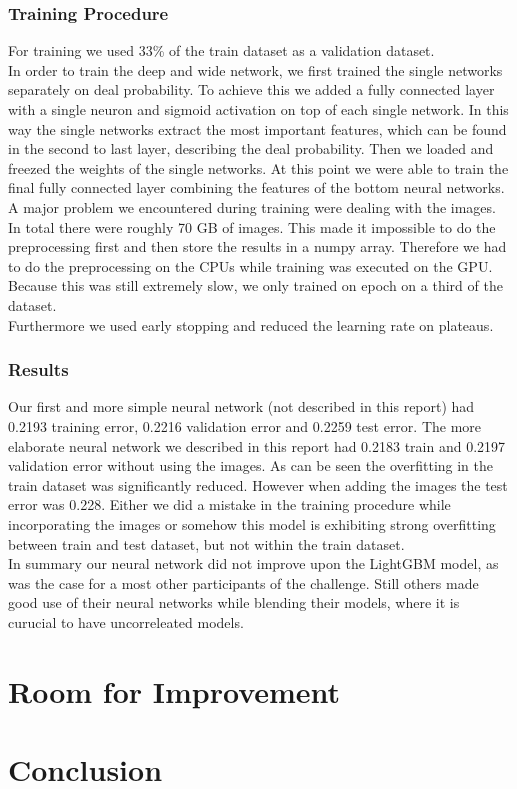 \documentclass[runningheads]{llncs}
\begin{document}
 \subsubsection{Training Procedure}
 For training we used 33\% of the train dataset as a validation dataset.\\
In order to train the deep and wide network, we first trained the single networks separately on deal probability. To achieve this we added a fully connected layer with a single neuron and sigmoid activation on top of each single network. In this way the single networks extract the most important features, which can be found in the second to last layer, describing the deal probability. Then we loaded and freezed the weights of the single networks. At this point we were able to train the final fully connected layer combining the features of the bottom neural networks.\\
A major problem we encountered during training were dealing with the images. In total there were roughly 70 GB of images. This made it impossible to do the preprocessing first and then store the results in a numpy array. Therefore we had to do the preprocessing on the CPUs while training was executed on the GPU. Because this was still extremely slow, we only trained on epoch on a third of the dataset.\\
Furthermore we used early stopping and reduced the learning rate on plateaus.
 \subsubsection{Results}
 Our first and more simple neural network (not described in this report) had 0.2193 training error, 0.2216 validation error and 0.2259 test error. The more elaborate neural network we described in this report had 0.2183 train and 0.2197 validation error without using the images. As can be seen the overfitting in the train dataset was significantly reduced. However when adding the images the test error was 0.228. Either we did a mistake in the training procedure while incorporating the images or somehow this model is exhibiting strong overfitting between train and test dataset, but not within the train dataset.\\
 In summary our neural network did not improve upon the LightGBM model, as was the case for a most other participants of the challenge. Still others made good use of their neural networks while  blending their models, where it is curucial
  to have uncorreleated models.\\
 
 
 \section{Room for Improvement}
 \section{Conclusion}
\end{document}
